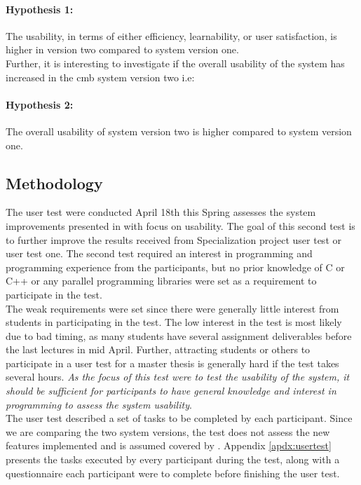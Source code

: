 \paragraph*{Hypothesis 1:} The usability, in terms of either efficiency, learnability, or user satisfaction, is higher in version two compared to system version one. \hfill \\

Further, it is interesting to investigate if the overall usability of the system has increased in the \gls{cmb} system version two i.e:

\paragraph*{Hypothesis 2:} The overall usability of system version two is higher compared to system version one. \hfill \\

\subsection{Methodology}
\label{sub-sec:user-testing-methodology}
The user test were conducted April 18th this Spring assesses the system improvements presented in  with focus on usability. The goal of this second test is to further improve the results received from Specialization project user test or user test one. The second test required an interest in programming and programming experience from the participants, but no prior knowledge of C or C++ or any parallel programming libraries were set as a requirement to participate in the test. \\

The weak requirements were set since there were generally little interest from students in participating in the test. The low interest in the test is most likely due to bad timing, as many students have several assignment deliverables before the last lectures in mid April. Further, attracting students or others to participate in a user test for a master thesis is generally hard if the test takes several hours. \textit{As the focus of this test were to test the usability of the system, it should be sufficient for participants to have general knowledge and interest in programming to assess the system usability}. \\

The user test described a set of tasks to be completed by each participant. Since we are comparing the two system versions, the test does not assess the new features implemented and is assumed covered by . Appendix \ref{apdx:usertest} presents the tasks executed by every participant during the test, along with a questionnaire each participant were to complete before finishing the user test. \\

